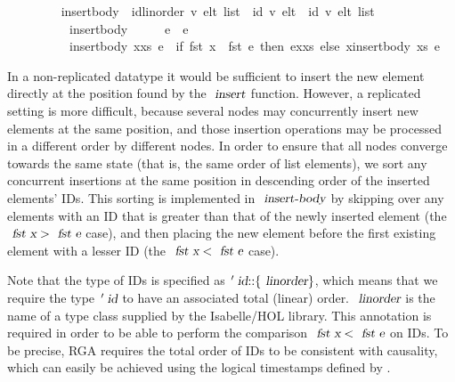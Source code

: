 \vspace{0.35em}
\begin{isabellebody}
\ \ \ \ \ \ \ \  insert{\isacharunderscore}body\ {\isacharcolon}{\isacharcolon}\ {\isachardoublequoteopen}{\isacharparenleft}{\isacharprime}id{\isacharcolon}{\isacharcolon}{\isacharbraceleft}linorder{\isacharbraceright}{\isacharcomma}\ {\isacharprime}v{\isacharparenright}\ elt\ list\ {\isasymRightarrow}\ {\isacharparenleft}{\isacharprime}id{\isacharcomma}\ {\isacharprime}v{\isacharparenright}\ elt\ {\isasymRightarrow}\ {\isacharparenleft}{\isacharprime}id{\isacharcomma}\ {\isacharprime}v{\isacharparenright}\ elt\ list{\isachardoublequoteclose}\ \isanewline
\ \ \ \ \ \ \ \ \ \ {\isachardoublequoteopen}insert{\isacharunderscore}body\ {\isacharbrackleft}{\isacharbrackright}\ \ \ \ \ e\ {\isacharequal}\ {\isacharbrackleft}e{\isacharbrackright}{\isachardoublequoteclose}\ {\isacharbar}\isanewline
\ \ \ \ \ \ \ \ \ \ {\isachardoublequoteopen}insert{\isacharunderscore}body\ {\isacharparenleft}x{\isacharhash}xs{\isacharparenright}\ e\ {\isacharequal}\ {\isacharparenleft}if\ fst\ x\ {\isacharless}\ fst\ e\ then\ e{\isacharhash}x{\isacharhash}xs\ else\ x{\isacharhash}insert{\isacharunderscore}body\ xs\ e{\isacharparenright}{\isachardoublequoteclose}
\end{isabellebody}
\vspace{0.35em}

In a non-replicated datatype it would be sufficient to insert the new element directly at the position found by the $\isa{insert}$ function.
However, a replicated setting is more difficult, because several nodes may concurrently insert new elements at the same position, and those insertion operations may be processed in a different order by different nodes.
In order to ensure that all nodes converge towards the same state (that is, the same order of list elements), we sort any concurrent insertions at the same position in descending order of the inserted elements' IDs.
This sorting is implemented in $\isa{insert-body}$ by skipping over any elements with an ID that is greater than that of the newly inserted element (the $\isa{fst x} > \isa{fst e}$ case), and then placing the new element before the first existing element with a lesser ID (the $\isa{fst x} < \isa{fst e}$ case).

Note that the type of IDs is specified as $\isacharprime\isa{id}\isacharcolon\isacharcolon\isacharbraceleft\isa{linorder}\isacharbraceright$, which means that we require the type $\isacharprime\isa{id}$ to have an associated total (linear) order.
$\isa{linorder}$ is the name of a type class supplied by the Isabelle/HOL library.
This annotation is required in order to be able to perform the comparison $\isa{fst x} < \isa{fst e}$ on IDs.
To be precise, RGA requires the total order of IDs to be consistent with causality, which can easily be achieved using the logical timestamps defined by \citet{Lamport:1978jq}.


